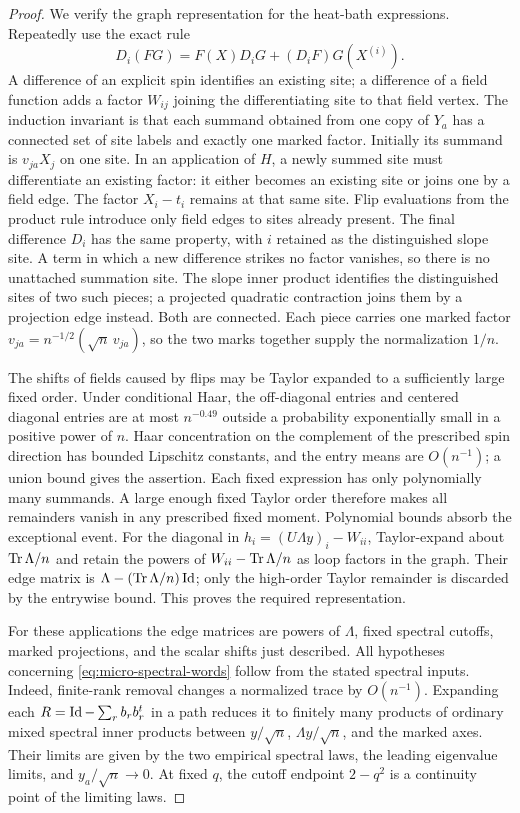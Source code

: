 \begin{proof}
We verify the graph representation for the heat-bath expressions.
Repeatedly use the exact rule
\[
 D_i(FG)=F(X)D_iG+(D_iF)G(X^{(i)}).
\]
A difference of an explicit spin identifies an existing site; a difference
of a field function adds a factor $W_{ij}$ joining the differentiating site
to that field vertex. The induction invariant is that each summand
obtained from one copy of $Y_a$ has a connected set of site labels and
exactly one marked factor. Initially its summand is $v_{ja}X_j$ on one
site. In an application of $H$, a newly summed site must differentiate
an existing factor: it either becomes an existing site or joins one by
a field edge. The factor $X_i-t_i$ remains at that same site. Flip
evaluations from the product rule introduce only field edges to sites
already present. The final difference $D_i$ has the same property, with
$i$ retained as the distinguished slope site. A term in which a new
difference strikes no factor vanishes, so there is no unattached
summation site. The slope inner product identifies the distinguished
sites of two such pieces; a projected quadratic contraction joins them
by a projection edge instead. Both are connected. Each piece carries
one marked factor $v_{ja}=n^{-1/2}(\sqrt n\,v_{ja})$, so the two marks
together supply the normalization $1/n$.

The shifts of fields caused by flips may be Taylor expanded to a
sufficiently large fixed order. Under conditional Haar, the off-diagonal
entries and centered diagonal entries are at most $n^{-0.49}$ outside a
probability exponentially small in a positive power of $n$. Haar
concentration on the complement of the prescribed spin direction has
bounded Lipschitz constants, and the entry means are $O(n^{-1})$;
a union bound gives the assertion. Each fixed expression has only
polynomially many summands. A large enough fixed Taylor order therefore
makes all remainders vanish in any prescribed fixed moment.
Polynomial bounds absorb the exceptional event. For the diagonal in
$h_i=(U\Lambda y)_i-W_{ii}$, Taylor-expand about $\operatorname{Tr}\Lambda/n$ and retain
the powers of $W_{ii}-\operatorname{Tr}\Lambda/n$ as loop factors in the graph.
Their edge matrix is $\Lambda-(\operatorname{Tr}\Lambda/n)\operatorname{Id}$; only the high-order
Taylor remainder is discarded by the entrywise bound.
This proves the required representation.

For these applications the edge matrices are powers of $\Lambda$,
fixed spectral cutoffs, marked projections, and the scalar shifts just
described. All hypotheses concerning \eqref{eq:micro-spectral-words}
follow from the stated spectral inputs. Indeed, finite-rank removal
changes a normalized trace by $O(n^{-1})$. Expanding each
$R=\operatorname{Id}-\sum_rb_rb_r^t$ in a path reduces it to finitely many products
of ordinary mixed spectral inner products between $y/\sqrt n$,
$\Lambda y/\sqrt n$, and the marked axes. Their limits are given by
the two empirical spectral laws, the leading eigenvalue limits, and
$y_a/\sqrt n\to0$. At fixed $q$, the cutoff endpoint $2-q^2$ is a
continuity point of the limiting laws.


\end{proof}
